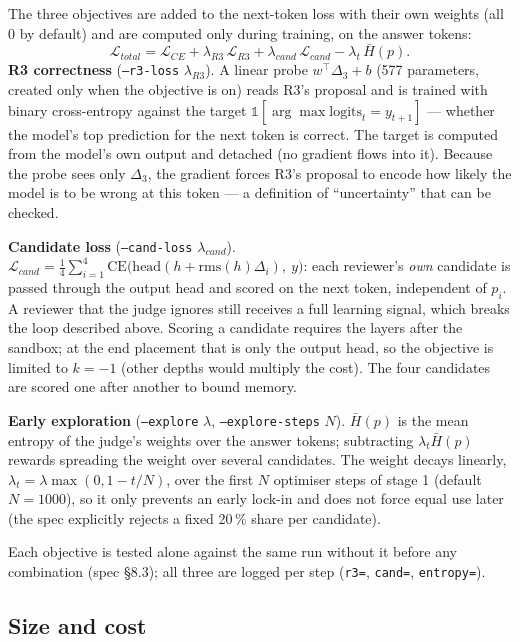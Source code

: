 \documentclass[a4paper,12pt,parskip=half,headsepline]{scrartcl}
\newcommand{\code}[1]{\texttt{\small #1}}
\begin{document}
\begin{tech}
The three objectives are added to the next-token loss with their own weights (all 0 by
default) and are computed only during training, on the answer tokens:
\[
\mathcal L_{total} = \mathcal L_{CE} + \lambda_{R3}\,\mathcal L_{R3} + \lambda_{cand}\,\mathcal L_{cand} - \lambda_t\,\bar H(p).
\]
\textbf{R3 correctness} (\code{--r3-loss} $\lambda_{R3}$). A linear probe $w^\top\Delta_3 + b$
(577 parameters, created only when the objective is on) reads R3's proposal and is trained
with binary cross-entropy against the target $\mathbb 1[\arg\max \text{logits}_t = y_{t+1}]$
--- whether the model's top prediction for the next token is correct. The target is
computed from the model's own output and detached (no gradient flows into it). Because
the probe sees only $\Delta_3$, the gradient forces R3's proposal to encode how likely the
model is to be wrong at this token --- a definition of ``uncertainty'' that can be checked.

\textbf{Candidate loss} (\code{--cand-loss} $\lambda_{cand}$).
$\mathcal L_{cand} = \tfrac14\sum_{i=1}^{4}\text{CE}\big(\text{head}(h + \text{rms}(h)\Delta_i),\ y\big)$:
each reviewer's \emph{own} candidate is passed through the output head and scored on the
next token, independent of $p_i$. A reviewer that the judge ignores still receives a full
learning signal, which breaks the loop described above. Scoring a candidate requires the
layers after the sandbox; at the end placement that is only the output head, so the
objective is limited to $k = -1$ (other depths would multiply the cost). The four
candidates are scored one after another to bound memory.

\textbf{Early exploration} (\code{--explore} $\lambda$, \code{--explore-steps} $N$).
$\bar H(p)$ is the mean entropy of the judge's weights over the answer tokens; subtracting
$\lambda_t\bar H(p)$ rewards spreading the weight over several candidates. The weight
decays linearly, $\lambda_t = \lambda\max(0, 1 - t/N)$, over the first $N$ optimiser steps of
stage 1 (default $N = 1000$), so it only prevents an early lock-in and does not force equal
use later (the spec explicitly rejects a fixed 20\,\% share per candidate).

Each objective is tested alone against the same run without it before any combination
(spec \S8.3); all three are logged per step (\code{r3=}, \code{cand=}, \code{entropy=}).
\end{tech}

\subsection{Size and cost}
\end{document}
